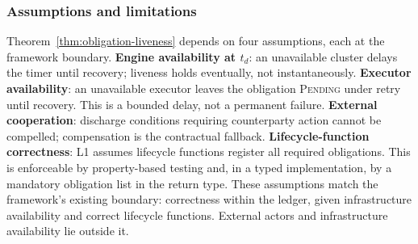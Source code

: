 \subsubsection{Assumptions and limitations}
\label{sec:obligation-limitations}

Theorem~\ref{thm:obligation-liveness} depends on four assumptions, each at the framework boundary. \textbf{Engine availability at $t_d$}: an unavailable cluster delays the timer until recovery; liveness holds eventually, not instantaneously. \textbf{Executor availability}: an unavailable executor leaves the obligation \textsc{Pending} under retry until recovery. This is a bounded delay, not a permanent failure. \textbf{External cooperation}: discharge conditions requiring counterparty action cannot be compelled; compensation is the contractual fallback. \textbf{Lifecycle-function correctness}: L1 assumes lifecycle functions register all required obligations. This is enforceable by property-based testing and, in a typed implementation, by a mandatory obligation list in the return type. These assumptions match the framework's existing boundary: correctness within the ledger, given infrastructure availability and correct lifecycle functions. External actors and infrastructure availability lie outside it.


